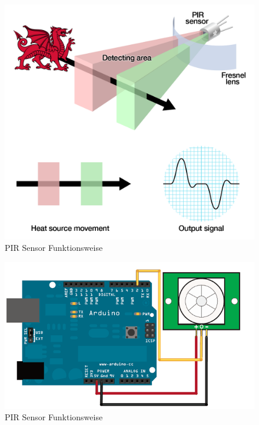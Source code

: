 \documentclass[conference]{IEEEtran}
\begin{document}
\begin{figure}[h]
	\begin{center}
		\includegraphics[scale=0.15]{pir4}
	\end{center}
	\caption{PIR Sensor Funktionsweise}
\end{figure}



\begin{figure}[h]
	\begin{center}
		\includegraphics[scale=0.35]{pir5}
	\end{center}
	\caption{PIR Sensor Funktionsweise}
\end{figure}
\end{document}
